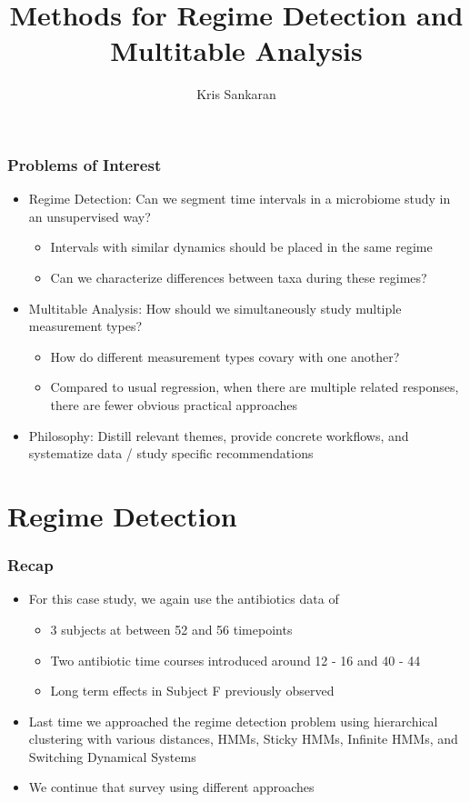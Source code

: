 \documentclass{beamer}
\title{Methods for Regime Detection and Multitable Analysis}
\author{Kris Sankaran}
\begin{document}
\maketitle

\begin{frame}
  \frametitle{Problems of Interest}
 \begin{itemize}
 \item Regime Detection: Can we segment time intervals in a microbiome study in
   an unsupervised way?
   \begin{itemize}
   \item Intervals with similar dynamics should be placed in the same regime
   \item Can we characterize differences between taxa during these regimes?
   \end{itemize}
 \item Multitable Analysis: How should we simultaneously study multiple
   measurement types?
   \begin{itemize}
   \item How do different measurement types covary with one another?
   \item Compared to usual regression, when there are multiple related
     responses, there are fewer obvious practical approaches
   \end{itemize}
 \item Philosophy: Distill relevant themes, provide concrete workflows, and
   systematize data / study specific recommendations
 \end{itemize}
\end{frame}

\section{Regime Detection}
\label{sec:regime_detection}

\begin{frame}
  \frametitle{Recap}
 \begin{itemize}
 \item For this case study, we again use the antibiotics data of
   \citep{dethlefsen2008pervasive}
   \begin{itemize}
   \item 3 subjects at between 52 and 56 timepoints
   \item Two antibiotic time courses introduced around 12 - 16 and 40 - 44
   \item Long term effects in Subject F previously observed
   \end{itemize}
 \item Last time we approached the regime detection problem using hierarchical
   clustering with various distances, HMMs, Sticky HMMs, Infinite HMMs, and
   Switching Dynamical Systems
 \item We continue that survey using different approaches
 \end{itemize}
\end{frame}
\end{document}
